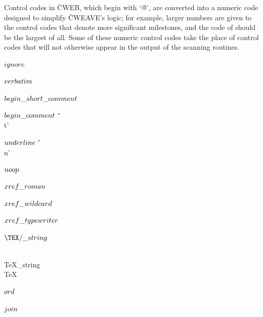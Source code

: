 \fi

Control codes in \.{CWEB}, which begin with `\.{@}', are converted
into a numeric code designed to simplify \.{CWEAVE}'s logic; for example,
larger numbers are given to the control codes that denote more significant
milestones, and the code of  should be the largest of
all. Some of these numeric control codes take the place of 
control codes that will not otherwise appear in the output of the
scanning routines.

\Y\B\4\D$\\{ignore}$ \5
\par
\B\4\D$\\{verbatim}$ \5
\par
\B\4\D$\\{begin\_short\_comment}$ \5
\par
\B\4\D$\\{begin\_comment}$ \5
\.{'\\t'}\par
\B\4\D$\\{underline}$ \5
\.{'\\n'}\par
\B\4\D$\\{noop}$ \5
\par
\B\4\D$\\{xref\_roman}$ \5
\par
\B\4\D$\\{xref\_wildcard}$ \5
\par
\B\4\D$\\{xref\_typewriter}$ \5
\par
\B\4\D$\TeXxstring$ \5
\par
\B\F\\{TeX\_string}\5
\\{TeX}\par
\B\4\D$\\{ord}$ \5
\par
\B\4\D$\\{join}$ \5
\par
